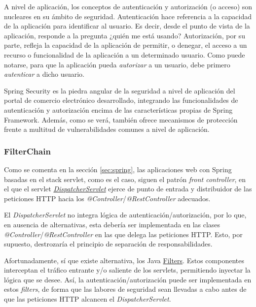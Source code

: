 \documentclass[a4paper]{article}
\begin{document}
	A nivel de aplicación, los conceptos de autenticación y autorización (o acceso) son nucleares en su ámbito de seguridad. Autenticación hace referencia a la capacidad de la aplicación para identificar al usuario. Es decir, desde el punto de vista de la aplicación, responde a la pregunta ¿quién me está usando? Autorización, por su parte, refleja la capacidad de la aplicación de permitir, o denegar, el acceso a un recurso o funcionalidad de la aplicación a un determinado usuario. Como puede notarse, para que la aplicación pueda \emph{autorizar} a un usuario, debe primero \emph{autenticar} a dicho usuario.
	
	Spring Security es la piedra angular de la seguridad a nivel de aplicación del portal de comercio electrónico desarrollado, integrando las funcionalidades de autenticación y autorización encima de las características propias de Spring Framework. Además, como se verá, también ofrece mecanismos de protección frente a multitud de vulnerabilidades comunes a nivel de aplicación.
	
	\subsubsection{FilterChain}
	Como se comenta en la sección \ref{sec:spring}, las aplicaciones web con Spring basadas en el stack servlet, como es el caso, siguen el patrón \emph{front controller}, en el que el servlet \href{https://docs.spring.io/spring/docs/current/spring-framework-reference/web.html#mvc-servlet}{\emph{DispatcherServlet}} ejerce de punto de entrada y distribuidor de las peticiones HTTP hacia los \emph{@Controller}/\emph{@RestController} adecuados.
	
	El \emph{DispatcherServlet} no integra lógica de autenticación/autorización, por lo que, en ausencia de alternativas, esta debería ser implementada en las clases \emph{@Controller}/\emph{@RestController} en las que delega las peticiones HTTP. Esto, por supuesto, destrozaría el principio de separación de responsabilidades. 
	
	Afortunadamente, sí que existe alternativa, los Java \href{https://www.oracle.com/java/technologies/filters.html}{Filters}. Estos componentes interceptan el tráfico entrante y/o saliente de los servlets, permitiendo inyectar la lógica que se desee. Así, la autenticación/autorización puede ser implementada en estos \emph{filters}, de forma que las labores de seguridad sean llevadas a cabo antes de que las peticiones HTTP alcancen el \emph{DispatcherServlet}.
	
\end{document}
